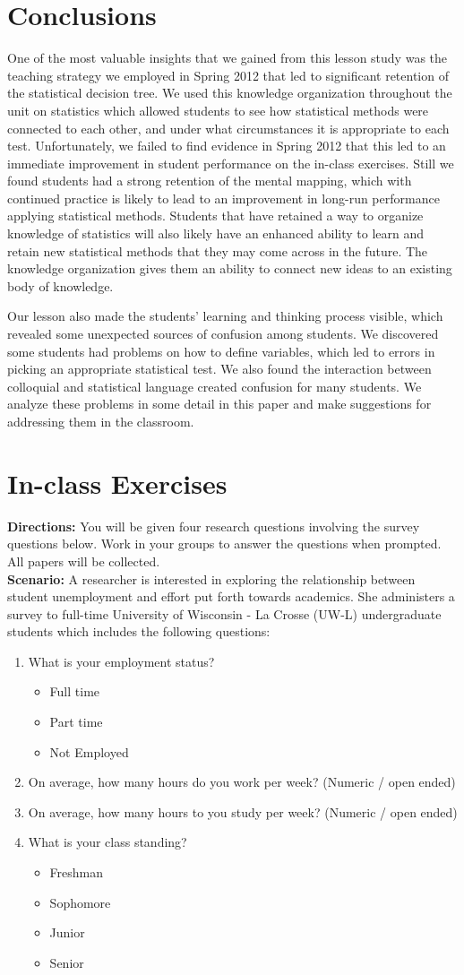 \documentclass[12pt]{article}
\newcommand{\bi}{\begin{itemize}}
\newcommand{\ei}{\end{itemize}}
\newcommand{\be}{\begin{enumerate}}
\newcommand{\ee}{\end{enumerate}}
\newcommand{\app}
{
\appendix
}
\newcommand{\appsection}[1]
{
\let\oldthesection\thesection
\renewcommand{\thesection}{Appendix \oldthesection}
\section{#1}\let\thesection\oldthesection
\renewcommand{\theequation}{\thesection\arabic{equation}}
\setcounter{equation}{0}
}
\begin{document}
\section{Conclusions} 
One of the most valuable insights that we gained from this lesson study was the teaching strategy we employed in Spring 2012 that led to significant retention of the statistical decision tree.  We used this knowledge organization throughout the unit on statistics which allowed students to see how statistical methods were connected to each other, and under what circumstances it is appropriate to each test.  Unfortunately, we failed to find evidence in Spring 2012 that this led to an immediate improvement in student performance on the in-class exercises.  Still we found students had a strong retention of the mental mapping, which with continued practice is likely to lead to an improvement in long-run performance applying statistical methods.  Students that have retained a way to organize knowledge of statistics will also likely have an enhanced ability to learn and retain new statistical methods that they may come across in the future.  The knowledge organization gives them an ability to connect new ideas to an existing body of knowledge.

Our lesson also made the students' learning and thinking process visible, which revealed some unexpected sources of confusion among students.  We discovered some students had problems on how to define variables, which led to errors in picking an appropriate statistical test.  We also found the interaction between colloquial and statistical language created confusion for many students.  We analyze these problems in some detail in this paper and make suggestions for addressing them in the classroom.

\newpage

\app\appsection{In-class Exercises}

\noindent \textbf{Directions:} You will be given four research questions involving the survey questions below.  Work in your groups to answer the questions when prompted.  All papers will be collected. \\

\noindent \textbf{Scenario:} A researcher is interested in exploring the relationship between student unemployment and effort put forth towards academics.  She administers a survey to full-time University of Wisconsin - La Crosse (UW-L) undergraduate students which includes the following questions:
\be
\item What is your employment status?
\bi \item Full time \item Part time \item Not Employed \ei
\item On average, how many hours do you work per week? (Numeric / open ended)
\item On average, how many hours to you study per week? (Numeric / open ended)
\item What is your class standing? \bi \item Freshman \item Sophomore \item Junior \item Senior \ei
\ee
\end{document}
